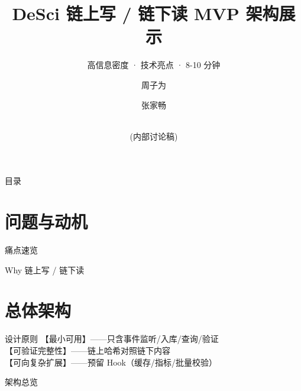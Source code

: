 \documentclass[10pt]{beamer}
\title{DeSci 链上写 / 链下读 MVP 架构展示}
\subtitle{高信息密度 · 技术亮点 · 8-10 分钟}
\author{周子为 \and 张家畅}
\date{\\(内部讨论稿)}
\begin{document}
\begin{frame}
  \titlepage
\end{frame}

\begin{frame}{目录}
  \tableofcontents
\end{frame}

\section{问题与动机}
\begin{frame}{痛点速览}
\end{frame}
\begin{frame}{Why 链上写 / 链下读}
\end{frame}

\section{总体架构}
\begin{frame}{设计原则}
  【最小可用】——只含事件监听/入库/查询/验证\\
  【可验证完整性】——链上哈希对照链下内容\\
  【可向复杂扩展】——预留 Hook（缓存/指标/批量校验）
\end{frame}
\begin{frame}{架构总览}
\end{frame}
\end{document}
